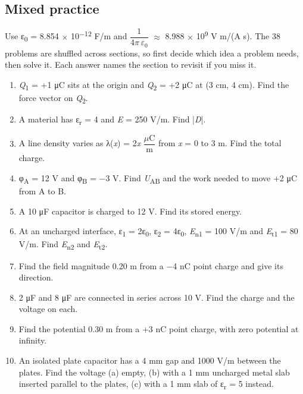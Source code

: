 \documentclass[11pt]{article}
\begin{document}
\begin{keepsection}
\section{Mixed practice}

Use ε\textsubscript{0} = 8.854 \ensuremath{\times} 10\textsuperscript{\ensuremath{-}12} F/m and {\small\ensuremath{\dfrac{1}{4π\, ε_{0}}}} \ensuremath{\approx} 8.988 \ensuremath{\times} 10\textsuperscript{9} V m/(A s). The 38 problems are shuffled across sections, so first decide which idea a problem needs, then solve it. Each answer names the section to revisit if you miss it.

\begin{enumerate}
\item \textit{Q}\textsubscript{1} = +1 μC sits at the origin and \textit{Q}\textsubscript{2} = +2 μC at (3 cm, 4 cm). Find the force vector on \textit{Q}\textsubscript{2}.
\item A material has ε\textsubscript{r} = 4 and \textit{E} = 250 V/m. Find |\textit{D}|.
\item A line density varies as λ(\textit{x}) = 2\textit{x} {\small\ensuremath{\dfrac{μ\mathrm{C}}{\mathrm{m}}}} from \textit{x} = 0 to 3 m. Find the total charge.
\item φ\textsubscript{A} = 12 V and φ\textsubscript{B} = \ensuremath{-}3 V. Find \textit{U}\textsubscript{AB} and the work needed to move +2 μC from A to B.
\item A 10 μF capacitor is charged to 12 V. Find its stored energy.
\item At an uncharged interface, ε\textsubscript{1} = 2ε\textsubscript{0}, ε\textsubscript{2} = 4ε\textsubscript{0}, \textit{E}\textsubscript{n1} = 100 V/m and \textit{E}\textsubscript{t1} = 80 V/m. Find \textit{E}\textsubscript{n2} and \textit{E}\textsubscript{t2}.
\item Find the field magnitude 0.20 m from a \ensuremath{-}4 nC point charge and give its direction.
\item 2 μF and 8 μF are connected in series across 10 V. Find the charge and the voltage on each.
\item Find the potential 0.30 m from a +3 nC point charge, with zero potential at infinity.
\item An isolated plate capacitor has a 4 mm gap and 1000 V/m between the plates. Find the voltage (a) empty, (b) with a 1 mm uncharged metal slab inserted parallel to the plates, (c) with a 1 mm slab of ε\textsubscript{r} = 5 instead.

\end{enumerate}
\end{keepsection}
\end{document}
